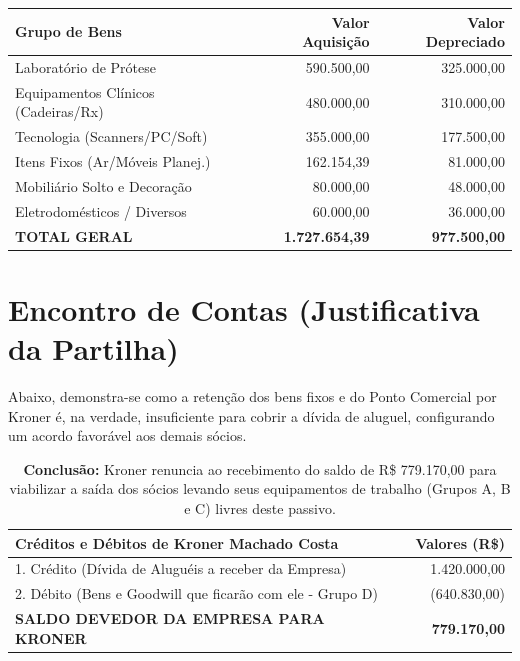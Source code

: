 \documentclass[12pt, a4paper]{article}
\begin{document}
\begin{table}[h!]
    \centering
    \small
    \renewcommand{\arraystretch}{1.2}
    \begin{tabularx}{\textwidth}{X r r}
        \toprule
        \rowcolor{tableHeader} \textbf{Grupo de Bens} & \textbf{Valor Aquisição} & \textbf{Valor Depreciado} \\
        \midrule
        Laboratório de Prótese & 590.500,00 & 325.000,00 \\
        Equipamentos Clínicos (Cadeiras/Rx) & 480.000,00 & 310.000,00 \\
        Tecnologia (Scanners/PC/Soft) & 355.000,00 & 177.500,00 \\
        Itens Fixos (Ar/Móveis Planej.) & 162.154,39 & 81.000,00 \\
        Mobiliário Solto e Decoração & 80.000,00 & 48.000,00 \\
        Eletrodomésticos / Diversos & 60.000,00 & 36.000,00 \\
        \midrule
        \rowcolor{lightGray} \textbf{TOTAL GERAL} & \textbf{1.727.654,39} & \textbf{977.500,00} \\
        \bottomrule
    \end{tabularx}
\end{table}

\section{Encontro de Contas (Justificativa da Partilha)}

Abaixo, demonstra-se como a retenção dos bens fixos e do Ponto Comercial por Kroner é, na verdade, insuficiente para cobrir a dívida de aluguel, configurando um acordo favorável aos demais sócios.

\begin{table}[H]
    \centering
    \begin{tabularx}{\textwidth}{X r}
        \toprule
        \textbf{Créditos e Débitos de Kroner Machado Costa} & \textbf{Valores (R\$)} \\
        \midrule
        1. Crédito (Dívida de Aluguéis a receber da Empresa) & 1.420.000,00 \\
        2. Débito (Bens e Goodwill que ficarão com ele - Grupo D) & (640.830,00) \\
        \midrule
        \textbf{SALDO DEVEDOR DA EMPRESA PARA KRONER} & \textbf{779.170,00} \\
        \bottomrule
    \end{tabularx}
    \caption*{\footnotesize \textbf{Conclusão:} Kroner renuncia ao recebimento do saldo de R\$ 779.170,00 para viabilizar a saída dos sócios levando seus equipamentos de trabalho (Grupos A, B e C) livres deste passivo.}
\end{table}
\pagebreak
\end{document}
